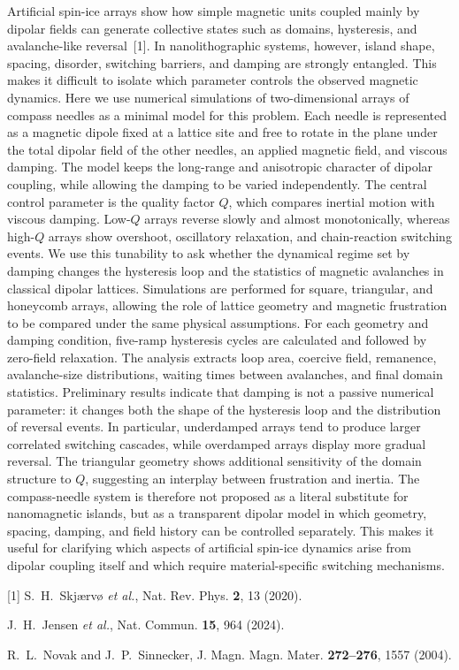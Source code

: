 \documentclass[12pt,a4paper]{article}
\begin{document}
Artificial spin-ice arrays show how simple magnetic units coupled mainly by dipolar fields can generate collective states such as domains, hysteresis, and avalanche-like reversal~[1]. In nanolithographic systems, however, island shape, spacing, disorder, switching barriers, and damping are strongly entangled. This makes it difficult to isolate which parameter controls the observed magnetic dynamics. Here we use numerical simulations of two-dimensional arrays of compass needles as a minimal model for this problem. Each needle is represented as a magnetic dipole fixed at a lattice site and free to rotate in the plane under the total dipolar field of the other needles, an applied magnetic field, and viscous damping. The model keeps the long-range and anisotropic character of dipolar coupling, while allowing the damping to be varied independently. The central control parameter is the quality factor $Q$, which compares inertial motion with viscous damping. Low-$Q$ arrays reverse slowly and almost monotonically, whereas high-$Q$ arrays show overshoot, oscillatory relaxation, and chain-reaction switching events. We use this tunability to ask whether the dynamical regime set by damping changes the hysteresis loop and the statistics of magnetic avalanches in classical dipolar lattices. Simulations are performed for square, triangular, and honeycomb arrays, allowing the role of lattice geometry and magnetic frustration to be compared under the same physical assumptions. For each geometry and damping condition, five-ramp hysteresis cycles are calculated and followed by zero-field relaxation. The analysis extracts loop area, coercive field, remanence, avalanche-size distributions, waiting times between avalanches, and final domain statistics. Preliminary results indicate that damping is not a passive numerical parameter: it changes both the shape of the hysteresis loop and the distribution of reversal events. In particular, underdamped arrays tend to produce larger correlated switching cascades, while overdamped arrays display more gradual reversal. The triangular geometry shows additional sensitivity of the domain structure to $Q$, suggesting an interplay between frustration and inertia. The compass-needle system is therefore not proposed as a literal substitute for nanomagnetic islands, but as a transparent dipolar model in which geometry, spacing, damping, and field history can be controlled separately. This makes it useful for clarifying which aspects of artificial spin-ice dynamics arise from dipolar coupling itself and which require material-specific switching mechanisms.\par
\vspace{6pt}
[1] S.~H.~Skj{\ae}rv{\o} \textit{et al.}, Nat. Rev. Phys. \textbf{2}, 13 (2020).\par
[2] J.~H.~Jensen \textit{et al.}, Nat. Commun. \textbf{15}, 964 (2024).\par
[3] R.~L.~Novak and J.~P.~Sinnecker, J. Magn. Magn. Mater. \textbf{272--276}, 1557 (2004).
\end{document}

